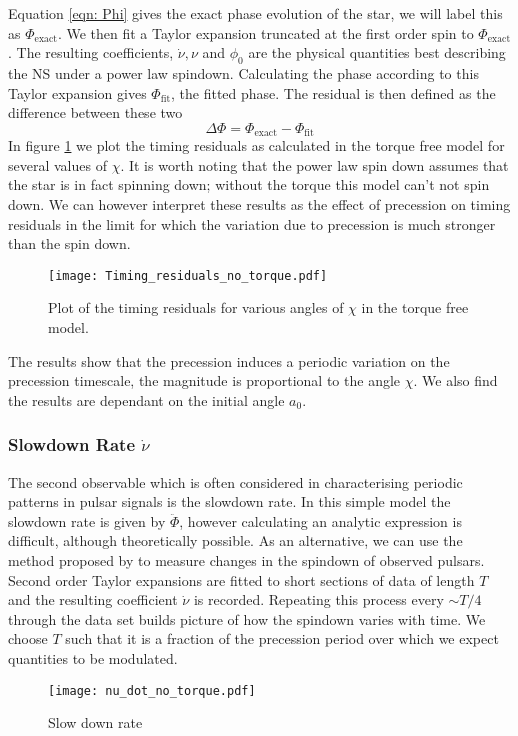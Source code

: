 \documentclass[/home/greg/Thesis/main/main.tex]{subfiles}
\begin{document}
Equation \eqref{eqn: Phi} gives the exact phase evolution of the star, we will
label this as $\Phi_{\textrm{exact}}$. We then fit a Taylor expansion truncated
at the first order spin to $\Phi_{\textrm{exact}}$. The resulting coefficients,
$\dot{\nu}, \nu$ and $\phi_{0}$ are the physical quantities best describing the
NS under a power law spindown. Calculating the phase according to this Taylor
expansion gives $\Phi_{\textrm{fit}}$, the fitted phase. The residual is then
defined as the difference between these two
\begin{equation}
  \Delta\Phi = \Phi_{\textrm{exact}} - \Phi_{\textrm{fit}}
\end{equation}
In figure \ref{fig: TR no torque} we plot the timing residuals as calculated in
the torque free model for several values of $\chi$. It is worth noting that the
power law spin down assumes that the star is in fact spinning down; without the
torque this model can't not spin down. We can however interpret these results
as the effect of precession on timing residuals in the limit for which the
variation due to precession is much stronger than the spin down.
\begin{figure}[ht]
\centering
	\texttt{[image: Timing\_residuals\_no\_torque.pdf]}
\caption{Plot of the timing residuals for various angles of $\chi$ in the torque free model. }
\label{fig: TR no torque}
\end{figure}
The results show that the precession induces a periodic variation on the
precession timescale, the magnitude is proportional to the angle $\chi$. We 
also find the results are dependant on the initial angle $a_{0}$.

\subsubsection{Slowdown Rate $\dot{\nu}$}

The second observable which is often considered in characterising periodic
patterns in pulsar signals is the slowdown rate. In this simple model the
slowdown rate is given by $\ddot{\Phi}$, however calculating an analytic
expression is difficult, although theoretically possible. As an alternative, we
can use the method proposed by \citet{Lyne2010} to measure changes in the
spindown of observed pulsars. Second order Taylor expansions are fitted to
short sections of data of length $T$ and the resulting coefficient $\dot{\nu}$
is recorded. Repeating this process every $\sim T/4$ through the data set
builds picture of how the spindown varies with time. We choose $T$ such that it
is a fraction of the precession period over which we expect quantities to be
modulated.
\begin{figure}[ht]
\centering
	\texttt{[image: nu\_dot\_no\_torque.pdf]}
\caption{Slow down rate }
\label{fig: nu_dot no torque}
\end{figure}
\end{document}
